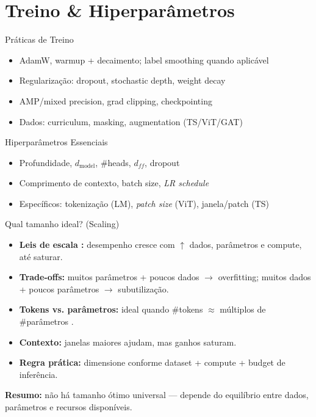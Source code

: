 \documentclass{beamer}
\begin{document}
\section{Treino \& Hiperparâmetros}
\begin{frame}{Práticas de Treino}
	\begin{itemize}
		\item AdamW, warmup + decaimento; label smoothing quando aplicável
		\item Regularização: dropout, stochastic depth, weight decay
		\item AMP/mixed precision, grad clipping, checkpointing
		\item Dados: curriculum, masking, augmentation (TS/ViT/GAT)
	\end{itemize}
\end{frame}

\begin{frame}{Hiperparâmetros Essenciais}
	\begin{itemize}
		\item Profundidade, $d_{\text{model}}$, \#heads, $d_{ff}$, dropout
		\item Comprimento de contexto, batch size, \textit{LR schedule}
		\item Específicos: tokenização (LM), \textit{patch size} (ViT), janela/patch (TS)
	\end{itemize}
\end{frame}

\begin{frame}{Qual tamanho ideal? (Scaling)}
\begin{itemize}
  \item \textbf{Leis de escala \cite{kaplan2020scaling}:} 
        desempenho cresce com $\uparrow$ dados, parâmetros e compute, até saturar.
        
  \item \textbf{Trade-offs:} 
        muitos parâmetros + poucos dados $\to$ overfitting; 
        muitos dados + poucos parâmetros $\to$ subutilização.

  \item \textbf{Tokens vs. parâmetros:} 
        ideal quando \#tokens $\approx$ múltiplos de \#parâmetros 
        \cite{hoffmann2022training}.

  \item \textbf{Contexto:} 
        janelas maiores ajudam, mas ganhos saturam.

  \item \textbf{Regra prática:} 
        dimensione conforme dataset + compute + budget de inferência.
\end{itemize}

\vspace{0.2cm}
\textbf{Resumo:} não há tamanho ótimo universal — depende do equilíbrio entre
dados, parâmetros e recursos disponíveis.
\end{frame}
\end{document}
